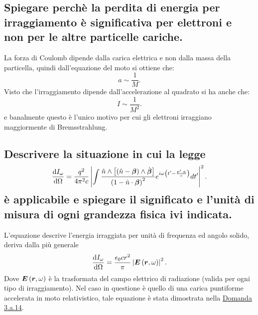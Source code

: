 \subsection[\hspace{1mm} Importanza della Bremsstralhung per gli elettroni]{Spiegare perchè la perdita di energia per irraggiamento è significativa per elettroni e non per le altre particelle cariche.
}\label{sec:4.a.10}
La forza di Coulomb dipende dalla carica elettrica e non dalla massa della particella, quindi dall'equazione del moto si ottiene che:
\[
	a \sim \frac{1}{M}
.\]
Visto che l'irraggiamento dipende dall'accelerazione al quadrato si ha anche che:
\[
	I\sim \frac{1}{M^2}
.\] 
e banalmente questo è l'unico motivo per cui gli elettroni irraggiano maggiormente di Bremsstrahlung.

\subsection[\hspace{1mm} Situazione di applicazione della energia irraggiata per unità di frequenza e di angolo solido]{Descrivere la situazione in cui la legge
\[
	\frac{\mbox{d}I_{\omega}}{\mbox{d}\Omega}=
	\frac{q^2}{4\pi^2c}\left|\int\frac{\hat{n}\wedge\left[\left(\hat{n}-\boldsymbol{\beta}\right)\wedge\dot{\boldsymbol{\beta}}\right]}{\left(1-\hat{n}\cdot\boldsymbol{\beta}\right)^2}
	e^{i\omega\left(t'-\frac{\boldsymbol{r}'\cdot\hat{n}}{c}\right)}dt'\right|^2 
.\] 
è applicabile e spiegare il significato e l'unità di misura di ogni grandezza fisica ivi
indicata.
}\label{sec:4.a.11}
L'equazione descrive l'energia irraggiata per unità di frequenza ed angolo solido, deriva dalla più generale 
\[
	\frac{\mbox{d} I_{\omega}}{\mbox{d} \Omega} = \frac{\epsilon_0 c r^2}{\pi} \left| \boldsymbol{E}\left( \boldsymbol{r}, \omega \right)  \right| ^2
.\] 
Dove $\boldsymbol{E}\left( \boldsymbol{r}, \omega \right)$ è la trasformata del campo elettrico di radiazione (valida per ogni tipo di irraggiamento).
Nel caso in questione è quello di una carica puntiforme accelerata in moto relativistico, tale equazione è stata dimostrata nella \hyperref[sec:3.a.14]{Domanda 3.a.14}.
